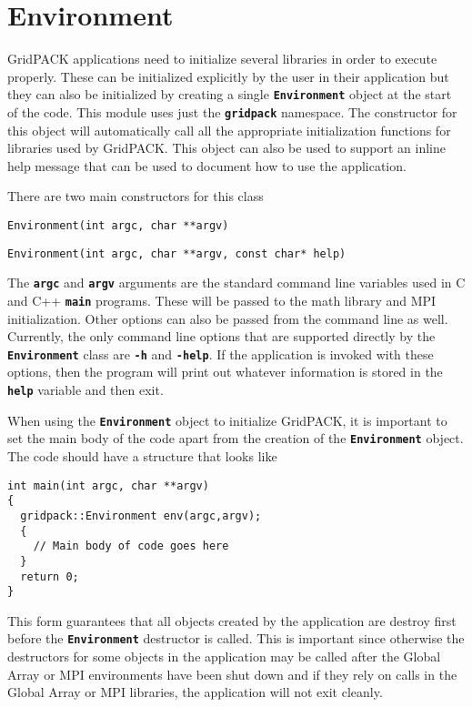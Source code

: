 \section{Environment}\label{environment}

GridPACK applications need to initialize several libraries in order to execute
properly. These can be initialized explicitly by the user in their
application but they can also be initialized by creating a single
\texttt{\textbf{Environment}} object at the start of the code. This module uses
just the \texttt{\textbf{gridpack}} namespace. The constructor
for this object will automatically call all the appropriate initialization
functions for libraries used by GridPACK. This object can also be used to
support an inline help message that can be used to document how to use the
application.

There are two main constructors for this class

{
\color{red}
\begin{Verbatim}[fontseries=b]
Environment(int argc, char **argv)
\end{Verbatim}
}

{
\color{red}
\begin{Verbatim}[fontseries=b]
Environment(int argc, char **argv, const char* help)
\end{Verbatim}
}

The \texttt{\textbf{argc}} and \texttt{\textbf{argv}} arguments are the standard
command line variables used in C and C++ \texttt{\textbf{main}} programs. These
will be passed to the math library and MPI initialization. Other options can also be
passed from the command line as well. Currently, the only command line
options that are supported directly by the \texttt{\textbf{Environment}} class
are \texttt{\textbf{-h}} and \texttt{\textbf{-help}}. If the application is invoked
with these options, then the program will print out whatever information is stored
in the \texttt{\textbf{help}} variable and then exit.

When using the \texttt{\textbf{Environment}} object to initialize GridPACK, it
is important to set the main body of the code apart from the creation of the
\texttt{\textbf{Environment}} object. The code should have a structure that
looks like

{
\color{red}
\begin{Verbatim}[fontseries=b]
int main(int argc, char **argv)
{
  gridpack::Environment env(argc,argv);
  {
    // Main body of code goes here
  }
  return 0;
}
\end{Verbatim}
}

This form guarantees that all objects created by the application are destroy
first before the \texttt{\textbf{Environment}} destructor is called. This is
important since otherwise the destructors for some objects in the application
may be called after the Global Array or MPI environments have been shut down and
if they rely on calls in the Global Array or MPI libraries, the application will
not exit cleanly.
